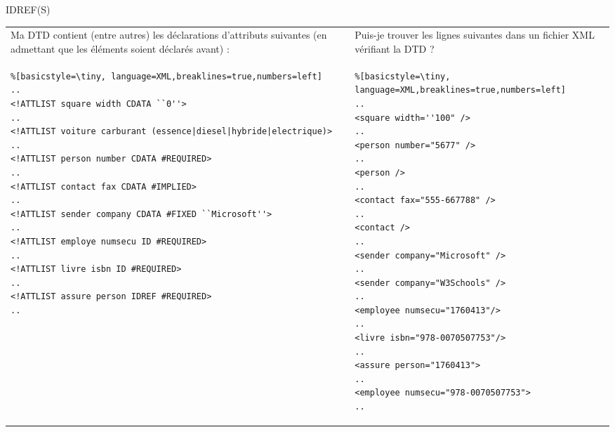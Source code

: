 \begin{frame}{IDREF(S)}
\lstset{numbers=left, basicstyle=\tiny}
\begin{tabular}{p{5.5cm} l p{4cm}}
Ma DTD contient (entre autres) les déclarations d'attributs suivantes (en admettant que les éléments soient déclarés avant) :
& &
Puis-je trouver les lignes suivantes dans un fichier XML vérifiant la DTD ?
\\
\begin{minipage}{0.5\textwidth}
\begin{lstlisting}%[basicstyle=\tiny, language=XML,breaklines=true,numbers=left]
..
<!ATTLIST square width CDATA ``0''>
..
<!ATTLIST voiture carburant (essence|diesel|hybride|electrique)> 
..
<!ATTLIST person number CDATA #REQUIRED>
..
<!ATTLIST contact fax CDATA #IMPLIED>
..
<!ATTLIST sender company CDATA #FIXED ``Microsoft''>
..
<!ATTLIST employe numsecu ID #REQUIRED>
..
<!ATTLIST livre isbn ID #REQUIRED>
..
<!ATTLIST assure person IDREF #REQUIRED>
..
\end{lstlisting}
\end{minipage}
& &
\begin{minipage}{0.35\textwidth}
\begin{lstlisting}%[basicstyle=\tiny, language=XML,breaklines=true,numbers=left]
..
<square width=''100" />
..
<person number="5677" />
..
<person />
..
<contact fax="555-667788" />
..
<contact />
..
<sender company="Microsoft" />
..
<sender company="W3Schools" />
..
<employee numsecu="1760413"/>
..
<livre isbn="978-0070507753"/>
..
<assure person="1760413">
..
<employee numsecu="978-0070507753">
..
\end{lstlisting}
\end{minipage}
\end{tabular}

\end{frame}


